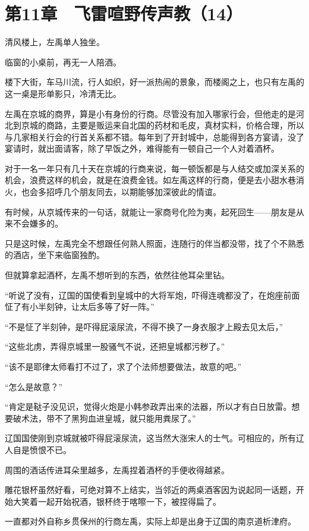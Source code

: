 \section{第11章　飞雷喧野传声教（14）}

清风楼上，左禹单人独坐。

临窗的小桌前，再无一人陪酒。

楼下大街，车马川流，行人如织，好一派热闹的景象，而楼阁之上，也只有左禹的这一桌是形单影只，冷清无比。

左禹在京城的商界，算是小有身份的行商。尽管没有加入哪家行会，但他走的是河北到京城的商路，主要是贩运来自北国的药材和毛皮，真材实料，价格合理，所以与几家相关行会的行首关系都不错。每年到了开封城中，总能得到各方宴请，没了宴请时，就出面请客，除了早饭之外，难得能有一顿自己一个人对着酒杯。

对于一名一年只有几十天在京城的行商来说，每一顿饭都是与人结交或加深关系的机会，浪费这样的机会，就是在浪费金钱。如左禹这样的行商，便是去小甜水巷消火，也会多招呼几个朋友同去，以期能够加深彼此的情谊。

有时候，从京城传来的一句话，就能让一家商号化险为夷，起死回生——朋友是从来不会嫌多的。

只是这时候，左禹完全不想跟任何熟人照面，连随行的伴当都没带，找了个不熟悉的酒店，坐下来临窗独酌。

但就算拿起酒杯，左禹不想听到的东西，依然往他耳朵里钻。

“听说了没有，辽国的国使看到皇城中的大将军炮，吓得连魂都没了，在炮座前面怔了有小半刻钟，让太后多等了好一阵。”

“不是怔了半刻钟，是吓得屁滚尿流，不得不换了一身衣服才上殿去见太后，”

“这些北虏，弄得京城里一股骚气不说，还把皇城都污秽了。”

“该不是耶律太师看打不过了，求了个法师想要做法，故意的吧。”

“怎么是故意？”

“肯定是鞑子没见识，觉得火炮是小韩参政弄出来的法器，所以才有白日放雷。想要破术法，带不了黑狗血进皇城，就只能用粪尿了。”

辽国国使刚到京城就被吓得屁滚尿流，这当然大涨宋人的士气。可相应的，所有辽人自是愤恨不已。

周围的酒话传进耳朵里越多，左禹捏着酒杯的手便收得越紧。

雕花银杯虽然好看，可绝对算不上结实，当邻近的两桌酒客因为说起同一话题，开始大笑着一起开始祝酒，银杯终于喀嚓一下，被捏得扁了。

一直都对外自称乡贯保州的行商左禹，实际上却是出身于辽国的南京道析津府。

